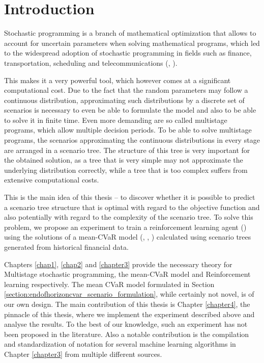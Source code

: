 \chapter*{Introduction}
Stochastic programming is a branch of mathematical optimization that allows to account for uncertain parameters when solving mathematical programs, which led to the widespread adoption of stochastic programming in fields such as finance, transportation, scheduling and telecommunications (\cite{stochasticprogrammingbible2009}, \cite{stochasticprogrammingbible}). 

This makes it a very powerful tool, which however comes at a significant computational cost. Due to the fact that the random parameters may follow a continuous distribution, approximating such distributions by a discrete set of scenarios is necessary to even be able to formulate the model and also to be able to solve it in finite time. Even more demanding are so called multistage programs, which allow multiple decision periods. To be able to solve multistage programs, the scenarios approximating the continuous distributions in every stage are arranged in a scenario tree. The structure of this tree is very important for the obtained solution, as a tree that is very simple may not approximate the underlying distribution correctly, while a tree that is too complex suffers from extensive computational costs. 

This is the main idea of this thesis -- to discover whether it is possible to predict a scenario tree structure that is optimal with regard to the objective function and also potentially with regard to the complexity of the scenario tree. To solve this problem, we propose an experiment to train a reinforcement learning agent (\cite{sutton2018reinforcement}) using the solutions of a mean-CVaR model (\cite{cvar_robust_mean_cvar_portfolio_optimization}, \cite{Rockafellar2000OptimizationOC}, \cite{cvar_general_loss_distributions}) calculated using scenario trees generated from historical financial data. 

Chapters \ref{chap1}, \ref{chap2} and \ref{chapter3} provide the necessary theory for Multistage stochastic programming, the mean-CVaR model and Reinforcement learning respectively. The mean CVaR model formulated in Section \ref{section:endofhorizoncvar_scenario_formulation}, while certainly not novel, is of our own design.  The main contribution of this thesis is Chapter \ref{chapter4}, the pinnacle of this thesis, where we implement the experiment described above and analyse the results. To the best of our knowledge, such an experiment has not been proposed in the literature. Also a notable contribution is the compilation and standardization of notation for several machine learning algorithms in Chapter \ref{chapter3} from multiple different sources.